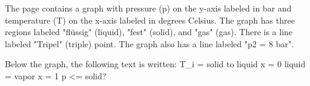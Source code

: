 The page contains a graph with pressure (p) on the y-axis labeled in bar and temperature (T) on the x-axis labeled in degrees Celsius. The graph has three regions labeled "flüssig" (liquid), "fest" (solid), and "gas" (gas). There is a line labeled "Tripel" (triple) point. The graph also has a line labeled "p2 = 8 bar".

Below the graph, the following text is written:
T_i = solid to liquid
x = 0 liquid = vapor
x = 1 p <= solid?